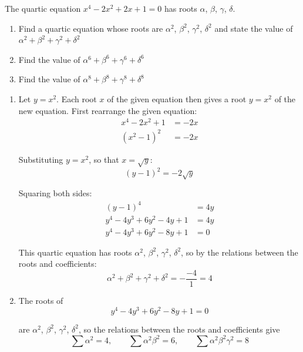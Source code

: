 \documentclass[leqno]{article}
\begin{document}
\begin{enumerate}[
  label=\textbf{\arabic*.},
  leftmargin=*,
  topsep=0pt,
  partopsep=0pt,
  parsep=0pt
]
\newpage

\questionitem

The quartic equation $x^4-2x^2+2x+1=0$ has roots $\alpha$, $\beta$, $\gamma$, $\delta$. \\

\begin{enumerate}[label=\textbf{(\alph*)}]
  \item Find a quartic equation whose roots are $\alpha^2$, $\beta^2$, $\gamma^2$, $\delta^2$ and state the value of $\alpha^2+\beta^2+\gamma^2+\delta^2$  \\
  \item Find the value of $\alpha^6+\beta^6+\gamma^6+\delta^6$  \\
  \item Find the value of $\alpha^8+\beta^8+\gamma^8+\delta^8$  \\
\end{enumerate}

\vspace*{10pt}

\begin{djsSolution}
\begin{enumerate}[label=\textbf{(\alph*)}]
  \item Let \(y=x^2\). Each root \(x\) of the given equation then gives a root \(y=x^2\) of the new equation. First rearrange the given equation:
\begin{align*}
x^4-2x^2+1&=-2x\\
(x^2-1)^2&=-2x
\end{align*}

Substituting \(y=x^2\), so that \(x=\sqrt{y}\):
\[
(y-1)^2=-2\sqrt{y}
\]

Squaring both sides:
\begin{align*}
(y-1)^4&=4y\\
y^4-4y^3+6y^2-4y+1&=4y\\
y^4-4y^3+6y^2-8y+1&=0
\end{align*}

This quartic equation has roots \(\alpha^2\), \(\beta^2\), \(\gamma^2\), \(\delta^2\), so by the relations between the roots and coefficients:
\[
\alpha^2+\beta^2+\gamma^2+\delta^2=-\frac{-4}{1}=4
\]

  \item The roots of
\[
y^4-4y^3+6y^2-8y+1=0
\]

are \(\alpha^2\), \(\beta^2\), \(\gamma^2\), \(\delta^2\), so the relations between the roots and coefficients give
\[
\sum\alpha^2=4,\qquad \sum\alpha^2\beta^2=6,\qquad \sum\alpha^2\beta^2\gamma^2=8
\]


\end{enumerate}
\end{djsSolution}
\end{enumerate}
\end{document}
